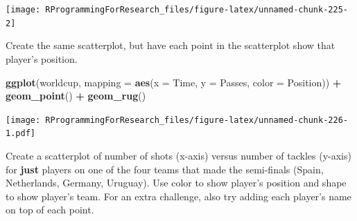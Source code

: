 \documentclass[]{book}
\makeatletter
\newenvironment{Shaded}{\begin{snugshade}}{\end{snugshade}}
\newcommand{\KeywordTok}[1]{\textcolor[rgb]{0.13,0.29,0.53}{\textbf{#1}}}
\newcommand{\DataTypeTok}[1]{\textcolor[rgb]{0.13,0.29,0.53}{#1}}
\newcommand{\StringTok}[1]{\textcolor[rgb]{0.31,0.60,0.02}{#1}}
\newcommand{\CommentTok}[1]{\textcolor[rgb]{0.56,0.35,0.01}{\textit{#1}}}
\newcommand{\OperatorTok}[1]{\textcolor[rgb]{0.81,0.36,0.00}{\textbf{#1}}}
\newcommand{\NormalTok}[1]{#1}
\newenvironment{kframe}{%
\medskip{}
\setlength{\fboxsep}{.8em}
 \def\at@end@of@kframe{}%
 \ifinner\ifhmode%
  \def\at@end@of@kframe{\end{minipage}}%
  \begin{minipage}{\columnwidth}%
 \fi\fi%
 \def\FrameCommand##1{\hskip\@totalleftmargin \hskip-\fboxsep
 \colorbox{shadecolor}{##1}\hskip-\fboxsep
     \hskip-\linewidth \hskip-\@totalleftmargin \hskip\columnwidth}%
 \MakeFramed {\advance\hsize-\width
   \@totalleftmargin\z@ \linewidth\hsize
   \@setminipage}}%
 {\par\unskip\endMakeFramed%
 \at@end@of@kframe}
\renewenvironment{Shaded}{\begin{kframe}}{\end{kframe}}
\theoremstyle{definition}
\theoremstyle{definition}
\theoremstyle{definition}
\theoremstyle{remark}
\makeatother
\begin{document}
\begin{Shaded}
\end{Shaded}

\begin{center}\texttt{[image: RProgrammingForResearch\_files/figure-latex/unnamed-chunk-225-2]} \end{center}

Create the same scatterplot, but have each point in the scatterplot show
that player's position.

\begin{Shaded}
\begin{Highlighting}[]
\KeywordTok{ggplot}\NormalTok{(worldcup,}
       \DataTypeTok{mapping =} \KeywordTok{aes}\NormalTok{(}\DataTypeTok{x =}\NormalTok{ Time, }\DataTypeTok{y =}\NormalTok{ Passes, }\DataTypeTok{color =}\NormalTok{ Position)) }\OperatorTok{+}\StringTok{ }
\StringTok{  }\KeywordTok{geom_point}\NormalTok{() }\OperatorTok{+}\StringTok{ }
\StringTok{  }\KeywordTok{geom_rug}\NormalTok{()}
\end{Highlighting}
\end{Shaded}

\texttt{[image: RProgrammingForResearch\_files/figure-latex/unnamed-chunk-226-1.pdf]}

Create a scatterplot of number of shots (x-axis) versus number of
tackles (y-axis) for \textbf{just} players on one of the four teams that
made the semi-finals (Spain, Netherlands, Germany, Uruguay). Use color
to show player's position and shape to show player's team. For an extra
challenge, also try adding each player's name on top of each point.
\end{document}
